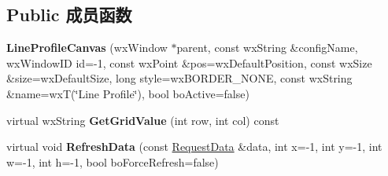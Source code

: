 \subsection*{Public 成员函数}
\begin{DoxyCompactItemize}
\item 
\hypertarget{class_line_profile_canvas_a2a5cf98d2c2cad1f2bac5ec9e917a28d}{{\bfseries Line\+Profile\+Canvas} (wx\+Window $\ast$parent, const wx\+String \&config\+Name, wx\+Window\+I\+D id=-\/1, const wx\+Point \&pos=wx\+Default\+Position, const wx\+Size \&size=wx\+Default\+Size, long style=wx\+B\+O\+R\+D\+E\+R\+\_\+\+N\+O\+N\+E, const wx\+String \&name=wx\+T(\char`\"{}Line Profile\char`\"{}), bool bo\+Active=false)}\label{class_line_profile_canvas_a2a5cf98d2c2cad1f2bac5ec9e917a28d}

\item 
\hypertarget{class_line_profile_canvas_a7520ae5663ed28834ebe92e62c36c61c}{virtual wx\+String {\bfseries Get\+Grid\+Value} (int row, int col) const }\label{class_line_profile_canvas_a7520ae5663ed28834ebe92e62c36c61c}

\item 
\hypertarget{class_line_profile_canvas_a7d2fa6f0bf9ccbe20227ab6d9329b858}{virtual void {\bfseries Refresh\+Data} (const \hyperlink{struct_request_data}{Request\+Data} \&data, int x=-\/1, int y=-\/1, int w=-\/1, int h=-\/1, bool bo\+Force\+Refresh=false)}\label{class_line_profile_canvas_a7d2fa6f0bf9ccbe20227ab6d9329b858}

\end{DoxyCompactItemize}
